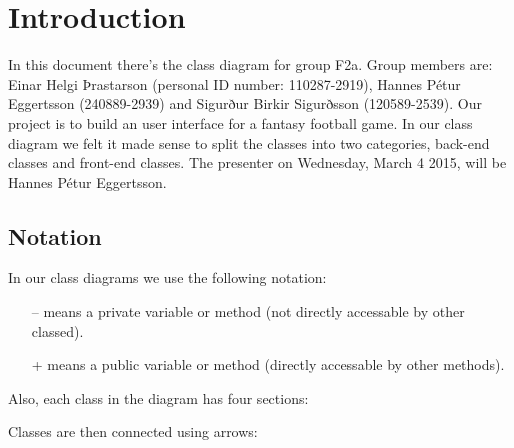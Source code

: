 \documentclass{article}
\begin{document}
\section{Introduction}
In this document there's the class diagram for group F2a. Group members are: Einar Helgi Þrastarson (personal ID number: 110287-2919), Hannes Pétur Eggertsson (240889-2939) and Sigurður Birkir Sigurðsson (120589-2539). Our project is to build an user interface for a fantasy football game. In our class diagram we felt it made sense to split the classes into two categories, back-end classes and front-end classes. The presenter on Wednesday, March 4 2015, will be Hannes Pétur Eggertsson.

\subsection{Notation}
In our class diagrams we use the following notation:\vspace*{-0.5cm}
\begin{itemize}\itemsep-4pt
\item[--] means a private variable or method (not directly accessable by other classed).
\item[+] means a public variable or method (directly accessable by other methods).
\end{itemize}


Also, each class in the diagram has four sections:
\begin{center}
\end{center}
Classes are then connected using arrows:
\end{document}
